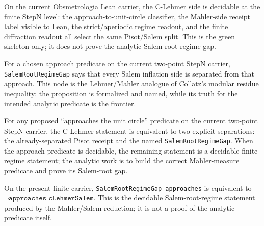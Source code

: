 \begin{theorem}\label{thm:c-lehmer-green-skeleton}\leanok{}
On the current Obsmetrologia Lean carrier, the C-Lehmer side is decidable at the
finite StepN level: the approach-to-unit-circle classifier, the Mahler-side
receipt label visible to Lean, the strict/aperiodic regime readout, and the
finite diffraction readout all select the same Pisot/Salem split.  This is the
green skeleton only; it does not prove the analytic Salem-root-regime gap.
\end{theorem}

\begin{proposition}\label{thm:c-lehmer-salem-root-regime-gap}\leanok{}
For a chosen approach predicate on the current two-point StepN carrier,
\texttt{SalemRootRegimeGap} says that every Salem inflation side is separated
from that approach.  This node is the Lehmer/Mahler analogue of Collatz's
modular residue inequality: the proposition is formalized and named, while its
truth for the intended analytic predicate is the frontier.
\end{proposition}

\begin{theorem}\label{thm:c-lehmer-finite-reduction}\leanok{}
For any proposed ``approaches the unit circle'' predicate on the current
two-point StepN carrier, the C-Lehmer statement is equivalent to two explicit
separations: the already-separated Pisot receipt and the named
\texttt{SalemRootRegimeGap}.  When the approach predicate is decidable, the
remaining statement is a decidable finite-regime statement; the analytic work is
to build the correct Mahler-measure predicate and prove its Salem-root gap.
\end{theorem}

\begin{theorem}\label{thm:c-lehmer-salem-root-regime-decision}\leanok{}
On the present finite carrier, \texttt{SalemRootRegimeGap approaches} is
equivalent to \(\neg\texttt{approaches cLehmerSalem}\).  This is the decidable
Salem-root-regime statement produced by the Mahler/Salem reduction; it is not a
proof of the analytic predicate itself.
\end{theorem}

